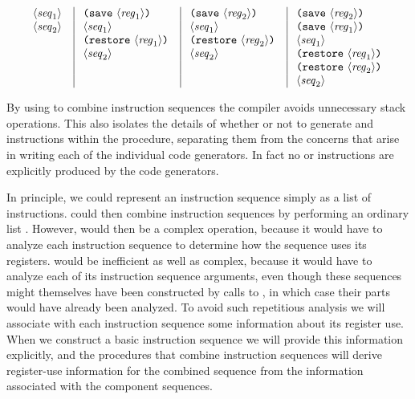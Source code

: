 $$\vbox{
\offinterlineskip
\halign{
\strut 	\kern0.8em # \kern0.4em \hfil & \vrule
	\kern0.8em # \kern0.4em \hfil & \vrule
	\kern0.8em # \kern0.4em \hfil & \vrule
	\kern0.8em # \kern0.4em \hfil \cr

  $\langle{\mathit{seq}_1}\rangle$
& \hbox{\tt (save} $\langle{\mathit{reg}_1}\rangle${\tt)}
& \hbox{\tt (save} $\langle{\mathit{reg}_2}\rangle${\tt)}
& \hbox{\tt (save} $\langle{\mathit{reg}_2}\rangle${\tt)} \cr

  $\langle{\mathit{seq}_2}\rangle$
& $\langle{\mathit{seq}_1}\rangle$
& $\langle{\mathit{seq}_1}\rangle$
& \hbox{\tt (save} $\langle{\mathit{reg}_1}\rangle${\tt)} \cr

& \hbox{\tt (restore} $\langle{\mathit{reg}_1}\rangle${\tt)}
& \hbox{\tt (restore} $\langle{\mathit{reg}_2}\rangle${\tt)}
& $\langle{\mathit{seq}_1}\rangle$ \cr

& $\langle{\mathit{seq}_2}\rangle$
& $\langle{\mathit{seq}_2}\rangle$
& \hbox{\tt (restore} $\langle{\mathit{reg}_1}\rangle${\tt)} \cr

&  &
& \hbox{\tt (restore} $\langle{\mathit{reg}_2}\rangle${\tt)} \cr

&  &
& $\langle{\mathit{seq}_2}\rangle$ \cr
}
}$$


\noindent
By using  to combine instruction sequences the compiler avoids
unnecessary stack operations.  This also isolates the details of whether or not
to generate  and  instructions within the
 procedure, separating them from the concerns that arise in
writing each of the individual code generators.  In fact no  or
 instructions are explicitly produced by the code generators.

In principle, we could represent an instruction sequence simply as a list of
instructions.   could then combine
instruction sequences by performing an ordinary list .  However,
 would then be a complex operation, because it would have to
analyze each instruction sequence to determine how the sequence uses its
registers.   would be inefficient as well as complex, because
it would have to analyze each of its instruction sequence arguments, even
though these sequences might themselves have been constructed by calls to
, in which case their parts would have already been analyzed.
To avoid such repetitious analysis we will associate with each instruction
sequence some information about its register use.  When we construct a basic
instruction sequence we will provide this information explicitly, and the
procedures that combine instruction sequences will derive register-use
information for the combined sequence from the information associated with the
component sequences.


